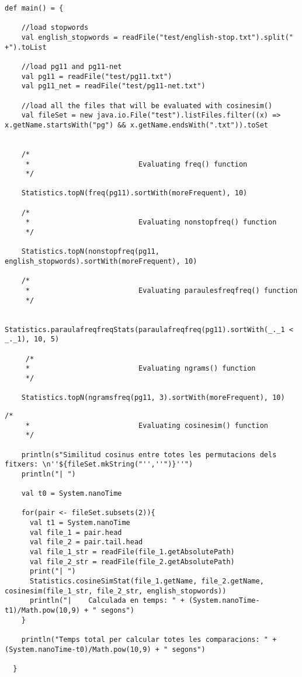 \documentclass{report}
\begin{document}
\begin{lstlisting}[style=scalaHighlight]
def main() = {

    //load stopwords
    val english_stopwords = readFile("test/english-stop.txt").split(" +").toList

    //load pg11 and pg11-net
    val pg11 = readFile("test/pg11.txt")
    val pg11_net = readFile("test/pg11-net.txt")

    //load all the files that will be evaluated with cosinesim()
    val fileSet = new java.io.File("test").listFiles.filter((x) => x.getName.startsWith("pg") && x.getName.endsWith(".txt")).toSet


    /*
     * 							Evaluating freq() function
     */

    Statistics.topN(freq(pg11).sortWith(moreFrequent), 10)

    /*
     * 							Evaluating nonstopfreq() function
     */

    Statistics.topN(nonstopfreq(pg11, english_stopwords).sortWith(moreFrequent), 10)

    /*
     * 							Evaluating paraulesfreqfreq() function
     */

    Statistics.paraulafreqfreqStats(paraulafreqfreq(pg11).sortWith(_._1 < _._1), 10, 5)

     /*
     * 							Evaluating ngrams() function
     */

    Statistics.topN(ngramsfreq(pg11, 3).sortWith(moreFrequent), 10)
\end{lstlisting}

\newpage

\begin{lstlisting}[style=scalaHighlight]
    /*
     * 							Evaluating cosinesim() function
     */

    println(s"Similitud cosinus entre totes les permutacions dels fitxers: \n''${fileSet.mkString("'',''")}''")
    println("| ")

    val t0 = System.nanoTime

    for(pair <- fileSet.subsets(2)){
      val t1 = System.nanoTime
      val file_1 = pair.head
      val file_2 = pair.tail.head
      val file_1_str = readFile(file_1.getAbsolutePath)
      val file_2_str = readFile(file_2.getAbsolutePath)
      print("| ")
      Statistics.cosineSimStat(file_1.getName, file_2.getName, cosinesim(file_1_str, file_2_str, english_stopwords))
      println("|	Calculada en temps: " + (System.nanoTime-t1)/Math.pow(10,9) + " segons")
    }

    println("Temps total per calcular totes les comparacions: " + (System.nanoTime-t0)/Math.pow(10,9) + " segons")

  }
\end{lstlisting}
\end{document}
